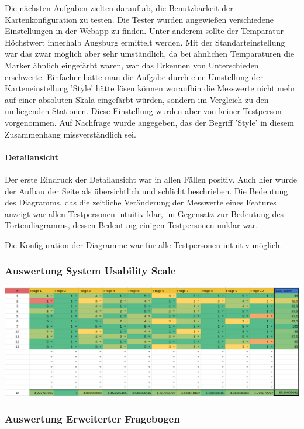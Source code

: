         Die nächsten Aufgaben zielten darauf ab, die Benutzbarkeit der Kartenkonfiguration zu testen. Die Tester wurden angewießen verschiedene Einstellungen in der Webapp zu finden. Unter anderem sollte der Temparatur Höchstwert innerhalb Augsburg ermittelt werden. Mit der Standarteinstellung war das zwar möglich aber sehr umständlich, da bei ähnlichen Temparaturen die Marker ähnlich eingefärbt waren, war das Erkennen von Unterschieden erschwerte.
        Einfacher hätte man die Aufgabe durch eine Umstellung der Karteneinstellung 'Style' hätte lösen können woraufhin die Messwerte nicht mehr auf einer absoluten Skala eingefärbt würden, sondern im Vergleich zu den umliegenden Stationen. Diese Einstellung wurden aber von keiner Testperson vorgenommen. Auf Nachfrage wurde angegeben, das der Begriff 'Style' in diesem Zusammenhang missverständlich sei.
     
      \paragraph{Detailansicht}
        Der erste Eindruck der Detailansicht war in allen Fällen positiv. Auch hier wurde der Aufbau der Seite als übersichtlich und schlicht beschrieben.
        Die Bedeutung des Diagramms, das die zeitliche Veränderung der Messwerte eines \glspl{Feature} anzeigt war allen Testpersonen intuitiv klar, im Gegensatz zur Bedeutung des Tortendiagramms, dessen Bedeutung einigen Testpersonen unklar war.
        
        Die Konfiguration der Diagramme war für alle Testpersonen intuitiv möglich.
     
    \subsubsection{Auswertung System Usability Scale}
      \includegraphics[width=1\linewidth]{figures/sus.png}\par\vspace{1cm}

    \subsubsection{Auswertung Erweiterter Fragebogen}
